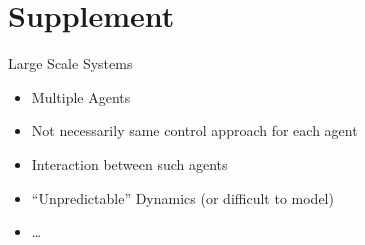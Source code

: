\documentclass[presentation]{beamer}
\begin{document}
\section{Supplement}
\begin{frame}[label={sec:orge1ce75b}]{Large Scale Systems}
\begin{itemize}
\item Multiple Agents
\item Not necessarily same control approach for each agent
\item Interaction between such agents
\item ``Unpredictable'' Dynamics (or difficult to model)
\item \ldots{}
\end{itemize}
\end{frame}
\end{document}
